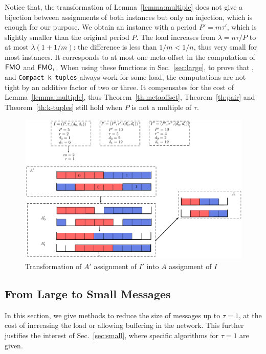 \documentclass[pdflatex,sn-mathphys,iicol]{sn-jnl}%
\theoremstyle{thmstyleone}%
\theoremstyle{thmstyletwo}%
\theoremstyle{thmstylethree}%
\begin{document}
Notice that, the transformation of Lemma~\ref{lemma:multiple} does not give a bijection between assignments of both instances but only an injection, which is enough for our purpose. 
We obtain an instance with a period $P'= m\tau'$, which is slightly smaller than the original period $P$. The load increases from $\lambda = n \tau / P$ to at most $\lambda (1 + 1/m)$: the difference is less than $1/m < 1/n$, thus very small for most instances. It corresponds to at most one meta-offset in the computation of $\textsf{FMO}$ and $\textsf{FMO}_i$. When using these functions in Sec.~\ref{sec:large}, to prove that \metaoffset, \compactpair and \texttt{Compact k-tuples} always work for some load, the computations are not tight by an additive factor of two or three. It compensates for the cost of Lemma~\ref{lemma:multiple}, thus Theorem~\ref{th:metaoffset}, Theorem~\ref{th:pair} and Theorem~\ref{th:k-tuples} still hold when $P$ is not a multiple of $\tau$.



\begin{figure}
 \begin{center}
\includegraphics[scale=0.75]{multipleperiod}
\end{center}
\caption{Transformation of $A'$ assignment of $I'$ into $A$ assignment of $I$}
\label{fig:multipleperiod}
\end{figure}

\subsection{From Large to Small Messages}\label{sec:reduction}


In this section, we give methods to reduce the size of messages up to $\tau = 1$, at the cost of increasing the load or allowing buffering in the network. This further justifies the interest of Sec.~\ref{sec:small}, where specific algorithms for $\tau = 1$ are given.
\end{document}
